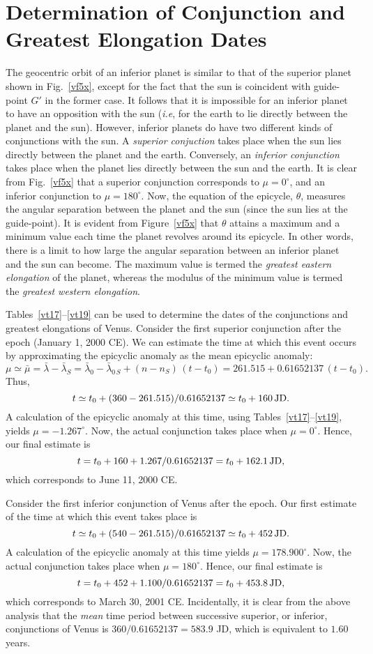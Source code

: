 \section{Determination of Conjunction and Greatest Elongation Dates}
The geocentric orbit of an inferior planet is similar to that of the
superior planet shown in Fig.~\ref{vf5x}, except for the fact that the sun
is coincident with guide-point $G'$ in the former case.
It follows that it is impossible
for an inferior planet to have an opposition with the sun ({\em i.e}, for the
earth to lie directly between the planet and the sun). However, inferior planets
do have two different kinds of conjunctions with the sun. A {\em superior
conjuction}\/ takes place when the sun lies directly between the planet and the earth.
Conversely, an {\em inferior conjunction}\/ takes place when the planet lies
directly between the sun and the earth. It is clear from Fig.~\ref{vf5x}
that a superior conjunction corresponds to $\mu=0^\circ$, and
an inferior conjunction to $\mu=180^\circ$. Now, the equation of the epicycle,
 $\theta$, measures the
angular separation between the planet and the sun (since the sun lies at
the guide-point). It is evident from Figure~\ref{vf5x} that $\theta$ attains
a maximum and a minimum value each time the planet revolves
around its epicycle.
In other words, there is a limit to how large the angular separation between
an inferior planet and the sun can become.
The maximum value is termed the {\em greatest eastern elongation}\/
of the planet, whereas the modulus of the minimum value is
termed the {\em greatest western elongation}. 

Tables~\ref{vt17}--\ref{vt19} can be used to determine the dates of the conjunctions  and greatest  elongations
of Venus. Consider the first superior conjunction after the epoch (January 1, 2000 CE). We can estimate the
time at which this event occurs by approximating the epicyclic anomaly as the 
mean epicyclic anomaly: 
$$
\mu \simeq \bar{\mu} = \bar{\lambda}-\bar{\lambda}_S = \bar{\lambda}_0-\bar{\lambda}_{0\,S} +
(n-n_S)\,(t-t_0) = 261.515 + 0.61652137\,(t-t_0).
$$
 Thus, 
$$
 t\simeq t_0 + (360-261.515)/0.61652137\simeq
t_0 + 160\, {\rm JD}.
$$
A calculation of the epicyclic anomaly at this time, using Tables~\ref{vt17}--\ref{vt19}, yields $\mu = -1.267^\circ$. Now, the actual conjunction
takes place when $\mu=0^\circ$. 
Hence, our final estimate is 
$$
t=t_0+160+1.267/0.61652137= t_0 + 162.1\,{\rm JD}, 
$$
which corresponds to June 11, 2000 CE.

Consider the first inferior conjunction of Venus after the epoch. Our first estimate of the time at which this
event takes place is 
$$
t\simeq t_0+(540-261.515)/0.61652137\simeq t_0 + 452\,{\rm JD}.
$$
A calculation of
the epicyclic anomaly at this time yields $\mu=178.900^\circ$. Now, the
actual conjunction takes place when $\mu=180^\circ$. 
 Hence, our final estimate is
$$
t = t_0 +452+1.100/0.61652137 = t_0+453.8\,{\rm JD},
$$
which corresponds to
March 30, 2001 CE. Incidentally, it is clear from the above analysis that the
{\em mean}\/ time period between successive superior, or  inferior, conjunctions of Venus is $360/0.61652137= 583.9$ JD, which is
equivalent to $1.60$ years.

